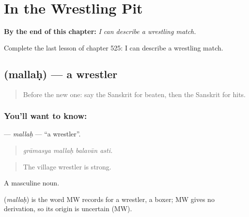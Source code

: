 
\chapter{In the Wrestling Pit}
\label{ch:sa-in-the-wrestling-pit}

\begin{chapteropening}
\textbf{By the end of this chapter:} \emph{I can describe a wrestling match.}

Complete the last lesson of chapter 525: I can describe a wrestling match.
\end{chapteropening}

\section[\texorpdfstring{\sk{मल्लः} (mallaḥ)}{मल्लः (mallaḥ)}]{ (mallaḥ) — a wrestler}

\label{lesson:SA-C525-mallah}



\begin{quote}
Before the new one: say the Sanskrit for beaten, then the Sanskrit for hits.
\end{quote}

\subsection*{You'll want to know: }
\textbf{} — \emph{mallaḥ} — \textquotedblleft{}a wrestler\textquotedblright{}.

\begin{quote}
   
\end{quote}

\begin{quote}
\emph{grāmasya mallaḥ balavān asti.}
\end{quote}

\begin{quote}
The village wrestler is strong.
\end{quote}

A masculine noun.

\begin{cousinweb}
\textbf{} (\emph{mallaḥ}) is the word MW records for a wrestler, a boxer; MW gives no derivation, so its origin is uncertain (MW).
\end{cousinweb}

